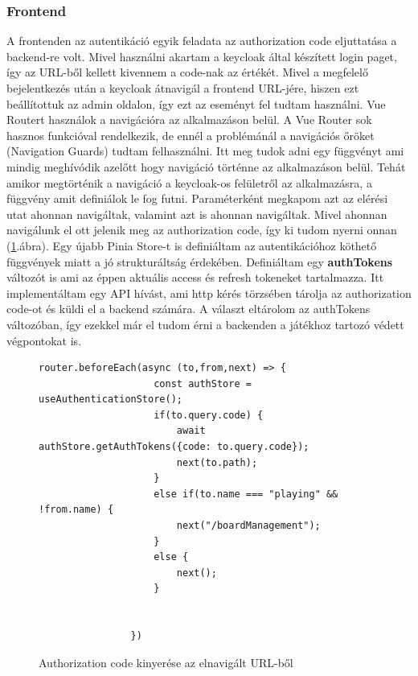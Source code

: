 \documentclass[a4paper,twoside]{article}
\begin{document}
\subsubsection{Frontend}
A frontenden az autentikáció egyik feladata az authorization code eljuttatása a backend-re volt. Mivel használni akartam a keycloak által 
készített login paget, így az URL-ből kellett kivennem a code-nak az értékét. Mivel a megfelelő bejelentkezés után a keycloak átnavigál a frontend 
URL-jére, hiszen ezt beállítottuk az admin oldalon, így ezt az eseményt fel tudtam használni. Vue Routert használok a navigációra az alkalmazáson belül. A Vue Router 
sok hasznos funkcióval rendelkezik, de ennél a problémánál a navigációs őröket (Navigation Guards) tudtam felhasználni. Itt meg tudok adni egy függvényt ami
mindig meghívódik azelőtt hogy navigáció történne az alkalmazáson belül. Tehát amikor megtörténik a navigáció a keycloak-os felületről az alkalmazásra, a függvény amit 
definiálok le fog futni. Paraméterként megkapom azt az elérési utat ahonnan navigáltak, valamint azt is ahonnan navigáltak. Mivel ahonnan navigálunk el ott jelenik meg az
authorization code, így ki tudom nyerni onnan (\ref{authCode}.ábra). Egy újabb Pinia Store-t is definiáltam az autentikációhoz köthető függvények miatt a jó strukturáltság érdekében. Definiáltam egy \textbf{authTokens} változót is ami az éppen aktuális access és refresh tokeneket tartalmazza. Itt implementáltam egy API hívást, ami http kérés törzsében tárolja az authorization code-ot és küldi el a backend számára. A választ eltárolom az authTokens változóban, így ezekkel már el tudom érni a backenden a játékhoz tartozó védett végpontokat is. 
\begin{figure}
	\caption{Authorization code kinyerése az elnavigált URL-ből}

		\begin{minipage}{\textwidth}
			\begin{lstlisting}[style=javascriptStyle]
				router.beforeEach(async (to,from,next) => {
					const authStore = useAuthenticationStore();
					if(to.query.code) {
						await authStore.getAuthTokens({code: to.query.code});
						next(to.path);
					}
					else if(to.name === "playing" && !from.name) {
						next("/boardManagement");
					}
					else {
						next();
					}
					
					
				})
			\end{lstlisting}
		\end{minipage}
	
	\label{authCode}
\end{figure}
\FloatBarrier
\end{document}
